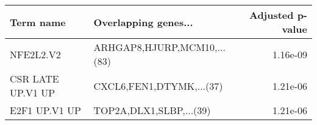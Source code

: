 \begin{tabular}{llr}
\toprule
        Term name &        Overlapping genes... &  Adjusted p-value \\
\midrule
        NFE2L2.V2 & ARHGAP8,HJURP,MCM10,...(83) &          1.16e-09 \\
CSR LATE UP.V1 UP &    CXCL6,FEN1,DTYMK,...(37) &          1.21e-06 \\
    E2F1 UP.V1 UP &     TOP2A,DLX1,SLBP,...(39) &          1.21e-06 \\
\bottomrule
\end{tabular}

